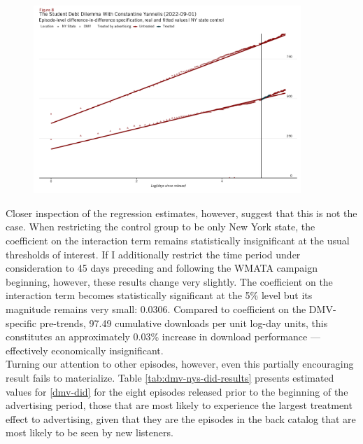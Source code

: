 \documentclass[11pt, letterpaper, twoside]{article}
\begin{document}
\begin{figure}[!htb]
  \centering
  \includegraphics[width=0.9\textwidth]{figures/yannelis_did_nys_plot.png}
  \caption{}
  \label{fig:yannelis-did-nys}
\end{figure}

Closer inspection of the regression estimates, however, suggest that this is not the case. When restricting the control group to be only New York state, the coefficient on the interaction term remains statistically insignificant at the usual thresholds of interest. If I additionally restrict the time period under consideration to 45 days preceding and following the WMATA campaign beginning, however, these results change very slightly. The coefficient on the interaction term becomes statistically significant at the 5\% level but its magnitude remains very small: 0.0306. Compared to coefficient on the DMV-specific pre-trends, 97.49 cumulative downloads per unit log-day units, this constitutes an approximately 0.03\% increase in download performance --- effectively economically insignificant.\\

Turning our attention to other episodes, however, even this partially encouraging result fails to materialize. Table \ref{tab:dmv-nys-did-results} presents estimated values for \eqref{dmv-did} for the eight episodes released prior to the beginning of the advertising period, those that are most likely to experience the largest treatment effect to advertising, given that they are the episodes in the back catalog that are most likely to be seen by new listeners.

\begin{landscape}
  
\end{landscape}
\end{document}
